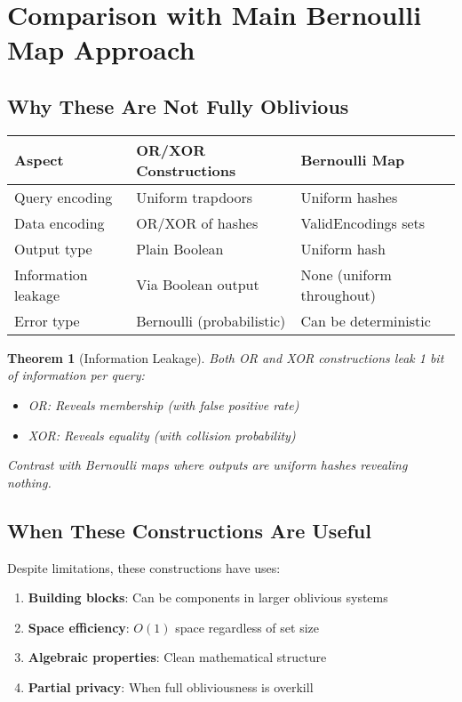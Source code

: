 \documentclass[11pt,final,hidelinks]{article}
\newtheorem{theorem}{Theorem}[section]
\begin{document}
\section{Comparison with Main Bernoulli Map Approach}

\subsection{Why These Are Not Fully Oblivious}

\begin{center}
\begin{tabular}{lll}
\toprule
\textbf{Aspect} & \textbf{OR/XOR Constructions} & \textbf{Bernoulli Map} \\
\midrule
Query encoding & Uniform trapdoors & Uniform hashes \\
Data encoding & OR/XOR of hashes & ValidEncodings sets \\
Output type & Plain Boolean & Uniform hash \\
Information leakage & Via Boolean output & None (uniform throughout) \\
Error type & Bernoulli (probabilistic) & Can be deterministic \\
\bottomrule
\end{tabular}
\end{center}

\begin{theorem}[Information Leakage]
Both OR and XOR constructions leak 1 bit of information per query:
\begin{itemize}
    \item OR: Reveals membership (with false positive rate)
    \item XOR: Reveals equality (with collision probability)
\end{itemize}
Contrast with Bernoulli maps where outputs are uniform hashes revealing nothing.
\end{theorem}

\subsection{When These Constructions Are Useful}

Despite limitations, these constructions have uses:
\begin{enumerate}
    \item \textbf{Building blocks}: Can be components in larger oblivious systems
    \item \textbf{Space efficiency}: $O(1)$ space regardless of set size  
    \item \textbf{Algebraic properties}: Clean mathematical structure
    \item \textbf{Partial privacy}: When full obliviousness is overkill
\end{enumerate}
\end{document}
